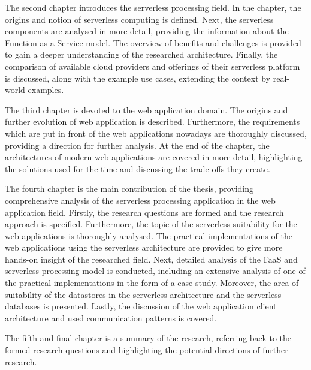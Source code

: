 The second chapter introduces the serverless processing field.
In the chapter, the origins and notion of serverless computing is defined.
Next, the serverless components are analysed in more detail, providing the information about the Function as a Service model.
The overview of benefits and challenges is provided to gain a deeper understanding of the researched architecture.
Finally, the comparison of available cloud providers and offerings of their serverless platform is discussed, along with the example use cases, extending the context by real-world examples.

The third chapter is devoted to the web application domain. The origins and further evolution of web application is described.
Furthermore, the requirements which are put in front of the web applications nowadays are thoroughly discussed, providing a direction for further analysis.
At the end of the chapter, the architectures of modern web applications are covered in more detail, highlighting the solutions used for the time and discussing the trade-offs they create.

The fourth chapter is the main contribution of the thesis, providing comprehensive analysis of the serverless processing application in the web application field.
Firstly, the research questions are formed and the research approach is specified.
Furthermore, the topic of the serverless suitability for the web applications is thoroughly analysed.
The practical implementations of the web applications using the serverless architecture are provided to give more hands-on insight of the researched field.
Next, detailed analysis of the FaaS and serverless processing model is conducted, including an extensive analysis of one of the practical implementations in the form of a case study.
Moreover, the area of suitability of the datastores in the serverless architecture and the serverless databases is presented.
Lastly, the discussion of the web application client architecture and used communication patterns is covered.

The fifth and final chapter is a summary of the research, referring back to the formed research questions and highlighting the potential directions of further research.

